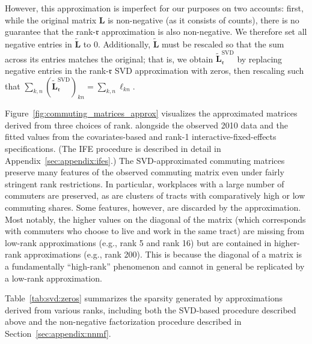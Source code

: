 \documentclass[11pt]{article}
\theoremstyle{definition}
\begin{document}
However, this approximation is imperfect for our purposes on two accounts: first, while the original matrix \(\mathbf{L}\) is non-negative (as it consists of counts),
there is no guarantee that the rank-\(\mathfrak{r}\) approximation is also non-negative.
We therefore set all negative entries in \(\tilde{\mathbf{L}}\) to \(0\).
Additionally, \(\tilde{\mathbf{L}}\) must be rescaled so that the sum across its entries matches the original;
that is, we obtain \(\tilde{\mathbf{L}}_{\mathfrak{r}}^\mathrm{SVD}\) by replacing negative entries in the rank-\(\mathfrak{r}\) SVD approximation with zeros,
then rescaling such that \(\sum_{k,n}\left(\tilde{\mathbf{L}}_{\mathfrak{r}}^\mathrm{SVD}\right)_{kn} = \sum_{k,n}\ell_{kn}\).

Figure~\ref{fig:commuting_matrices_approx} visualizes the approximated matrices derived from three choices of rank.
alongside the observed 2010 data and the fitted values from the covariates-based and rank-1 interactive-fixed-effects specifications.
(The IFE procedure is described in detail in Appendix~\ref{sec:appendix:ifes}.)
The SVD-approximated commuting matrices preserve many features of the observed commuting matrix even under fairly stringent rank restrictions.
In particular, workplaces with a large number of commuters are preserved, as are clusters of tracts with comparatively high or low commuting shares. 
Some features, however, are discarded by the approximation.
Most notably, the higher values on the diagonal of the matrix (which corresponds with commuters who choose to live and work in the same tract) are missing from low-rank approximations (e.g., rank 5 and rank 16) but are contained in higher-rank approximations (e.g., rank 200).
This is because the diagonal of a matrix is a fundamentally ``high-rank'' phenomenon and cannot in general be replicated by a low-rank approximation.

Table~\ref{tab:svd:zeros} summarizes the sparsity generated by approximations derived from various ranks,
including both the SVD-based procedure described above and the non-negative factorization procedure described in Section~\ref{sec:appendix:nnmf}.
\end{document}
